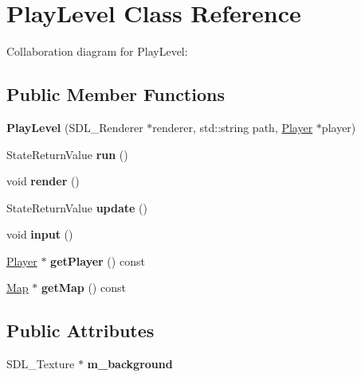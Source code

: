 \hypertarget{class_play_level}{}\section{Play\+Level Class Reference}
\label{class_play_level}


Collaboration diagram for Play\+Level\+:
\subsection*{Public Member Functions}
\begin{DoxyCompactItemize}
\item 
\mbox{\label{class_play_level_a7a142add2ad9e087b5a645de6af98fb5}} 
{\bfseries Play\+Level} (S\+D\+L\+\_\+\+Renderer $\ast$renderer, std\+::string path, \hyperlink{class_player}{Player} $\ast$player)
\item 
\mbox{\label{class_play_level_aca7ac805af2dac89826d52537b47244c}} 
State\+Return\+Value {\bfseries run} ()
\item 
\mbox{\label{class_play_level_a42c703590b0efea2eeb20fa339c0c84a}} 
void {\bfseries render} ()
\item 
\mbox{\label{class_play_level_a09a961b4743bf90578042fd9856a6194}} 
State\+Return\+Value {\bfseries update} ()
\item 
\mbox{\label{class_play_level_a031fe2cd10a9362d45e52695e1c5736a}} 
void {\bfseries input} ()
\item 
\mbox{\label{class_play_level_a47781a1eb5d15d9ab7e4f35d8e9692f6}} 
\hyperlink{class_player}{Player} $\ast$ {\bfseries get\+Player} () const
\item 
\mbox{\label{class_play_level_ad8c0b558a3ab57c31febfcd0ad99e20c}} 
\hyperlink{class_map}{Map} $\ast$ {\bfseries get\+Map} () const
\end{DoxyCompactItemize}
\subsection*{Public Attributes}
\begin{DoxyCompactItemize}
\item 
\mbox{\label{class_play_level_a526f6e531e0b13fa9b111ea8bf3b7b56}} 
S\+D\+L\+\_\+\+Texture $\ast$ {\bfseries m\+\_\+background}
\end{DoxyCompactItemize}
